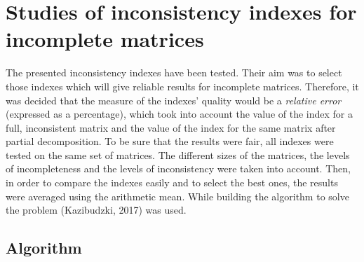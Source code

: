 \chapter{Studies of inconsistency indexes for incomplete matrices}
\label{sec:studiesOfInconsistencyIndexesForIncompleteMatrices}

The presented inconsistency indexes have been tested. Their aim was to select those indexes which will give reliable results for incomplete matrices. Therefore, it was decided that the measure of the indexes' quality would be a \textit{relative error} (expressed as a percentage), which took into account the value of the index for a full, inconsistent matrix and the value of the index for the same matrix after partial decomposition. To be sure that the results were fair, all indexes were tested on the same set of matrices. The different sizes of the matrices, the levels of incompleteness and the levels of inconsistency were taken into account. Then, in order to compare the indexes easily and to select the best ones, the results were averaged using the arithmetic mean. While building the algorithm to solve the problem (Kazibudzki, 2017) was used.

\section{Algorithm}
